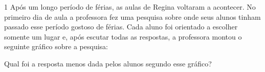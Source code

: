 {


\num{1} Após um longo período de férias, as aulas de Regina voltaram a
acontecer. No primeiro dia de aula a professora fez uma pesquisa sobre
onde seus alunos tinham passado esse período gostoso de férias. Cada
aluno foi orientado a escolher somente um lugar e, após escutar todas as
respostas, a professora montou o seguinte gráfico sobre a pesquisa:


Qual foi a resposta menos dada pelos alunos segundo esse gráfico?



}

